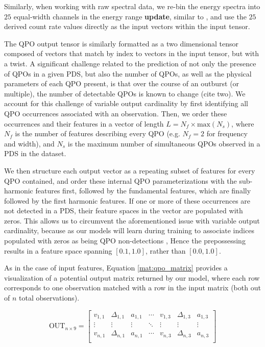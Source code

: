 \documentclass[fleqn,usenatbib]{mnras}
\begin{document}
Similarly, when working with raw spectral data, we re-bin the energy spectra into $25$ equal-width channels in the energy range \textbf{update}, similar to \cite{Pattnaik2020}, and use the $25$ derived count rate values directly as the input vectors within the input tensor. 

The QPO output tensor is similarly formatted as a two dimensional tensor composed of vectors that match by index to vectors in the input tensor, but with a twist. A significant challenge related to the prediction of not only the presence of QPOs in a given PDS, but also the number of QPOs, as well as the physical parameters of each QPO present, is that over the course of an outburst (or multiple), the number of detectable QPOs is known to change (cite two). We account for this challenge of variable output cardinality by first identifying all QPO occurrences associated with an observation. Then, we order these occurrences and their features in a vector of length $L=N_f\times \mathrm{max}(N_s)$, where $N_f$ is the number of features describing every QPO (e.g. $N_f=2$ for frequency and width), and $N_s$ is the maximum number of simultaneous QPOs observed in a PDS in the dataset. 

We then structure each output vector as a repeating subset of features for every QPO contained, and order these internal QPO parameterizations with the sub-harmonic features first, followed by the fundamental features, which are finally followed by the first harmonic features. If one or more of these occurrences are not detected in a PDS, their feature spaces in the vector are populated with zeros. This allows us to circumvent the aforementioned issue with variable output cardinality, because as our models will learn during training to associate indices populated with zeros as being QPO non-detections \citep{deepLearningPython}, Hence the prepossessing results in a feature space spanning $[0.1,1.0]$, rather than $[0.0,1.0]$.  

As in the case of input features, Equation \ref{mat:qpo_matrix} provides a visualization of a potential output matrix returned by our model, where each row corresponds to one observation matched with a row in the input matrix (both out of $n$ total observations). 

\begin{equation}\label{mat:qpo_matrix}
    \mathrm{OUT}_{n\times9} =
    \begin{bmatrix}
    v_{1,1} & \Delta_{1,1} &  a_{1,1} &  \cdots & v_{1,3} & \Delta_{1,3} &  a_{1,3}\\
    \vdots & \vdots & \vdots & \ddots & \vdots & \vdots & \vdots \\
    v_{n,1} & \Delta_{n,1} & a_{n,1} & \cdots & v_{n,3} & \Delta_{n,3} & a_{n,3} \\
    \end{bmatrix}
\end{equation}
\end{document}
